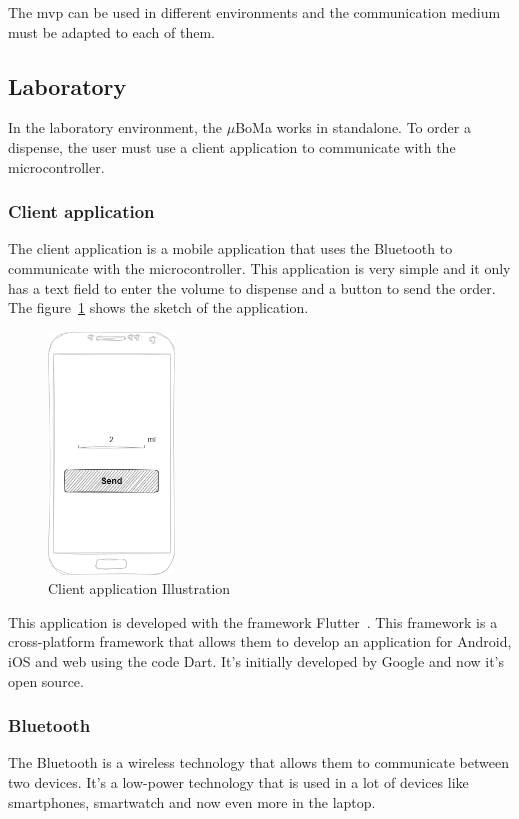 The \acrshort{mvp} can be used in different environments and the communication medium must be adapted to each of them.

\subsection{Laboratory}
\label{subsec:laboratory}
In the laboratory environment, the $\mu$BoMa works in standalone.
To order a dispense, the user must use a client application to communicate with the microcontroller.

\subsubsection{Client application}
\label{subsubsec:client}
The client application is a mobile application that uses the Bluetooth to communicate with the microcontroller.
This application is very simple and it only has a text field to enter the volume to dispense and a button to send the order.
The figure~\ref{fig:analysis:communication:laboratory:client} shows the sketch of the application.

\begin{figure}[ht]
    \centering
    \includegraphics[width=0.3\textwidth]{img/mobapp_sketch.drawio}
    \caption{Client application Illustration}
    \label{fig:analysis:communication:laboratory:client}
\end{figure}

This application is developed with the framework Flutter~\cite{flutter}.
This framework is a cross-platform framework that allows them to develop an application for Android, iOS and web using the code Dart.
It's initially developed by Google and now it's open source.

\subsubsection{Bluetooth}
\label{subsubsec:bluetooth}
The Bluetooth is a wireless technology that allows them to communicate between two devices.
It's a low-power technology that is used in a lot of devices like smartphones, smartwatch and now even more in the laptop.

